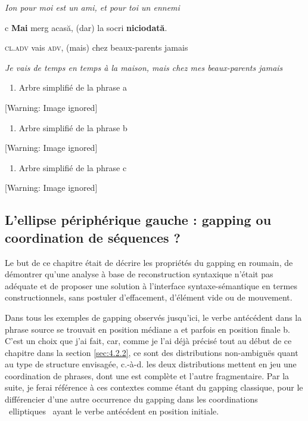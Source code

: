     \textit{Ion pour moi est un ami, et pour toi un ennemi } 

  c  \textbf{Mai} merg acasă, (dar) la socri \textbf{niciodată}.

\textsc{cl.adv} vais \textsc{adv}, (mais) chez beaux-parents jamais 

{\itshape
Je vais de temps en temps à la maison, mais chez mes beaux-parents jamais} 


\begin{enumerate}
\item \label{bkm:Ref299979855}Arbre simplifié de la phrase a


\end{enumerate}
{   [Warning: Image ignored] %
} 


\begin{enumerate}
\item \label{bkm:Ref299979857}Arbre simplifié de la phrase b


\end{enumerate}
{   [Warning: Image ignored] %
} 


\begin{enumerate}
\item \label{bkm:Ref299979859}Arbre simplifié de la phrase c


\end{enumerate}
{   [Warning: Image ignored] %
} 

\subsection{L'ellipse périphérique gauche : gapping ou coordination de séquences ?}
\label{bkm:Ref287994809}Le but de ce chapitre était de décrire les propriétés du gapping en roumain, de démontrer qu'une analyse à base de reconstruction syntaxique n'était pas adéquate et de proposer une solution à l'interface syntaxe-sémantique en termes constructionnels, sans postuler d'effacement, d'élément vide ou de mouvement. 

Dans tous les exemples de gapping observés jusqu'ici, le verbe antécédent dans la phrase source se trouvait en position médiane a et parfois en position finale b. C'est un choix que j'ai fait, car, comme je l'ai déjà précisé tout au début de ce chapitre dans la section \ref{sec:4.2.2}, ce sont des distributions non-ambiguës quant au type de structure envisagée, c.-à-d. les deux distributions mettent en jeu une coordination de phrases, dont une est complète et l'autre fragmentaire. Par la suite, je ferai référence à ces contextes comme étant du gapping classique, pour le différencier d'une autre occurrence du gapping dans les coordinations {\guillemotleft}~elliptiques~{\guillemotright} ayant le verbe antécédent en position initiale.


